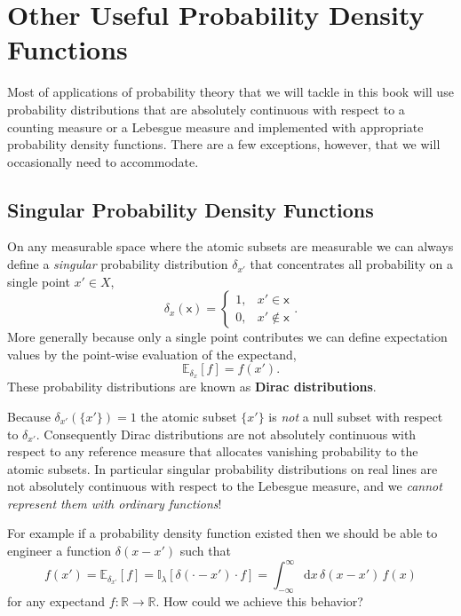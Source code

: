 \documentclass[
  letterpaper,
  DIV=11,
  numbers=noendperiod]{scrartcl}
\begin{document}
\hypertarget{other-useful-probability-density-functions}{%
\section{Other Useful Probability Density
Functions}\label{other-useful-probability-density-functions}}

Most of applications of probability theory that we will tackle in this
book will use probability distributions that are absolutely continuous
with respect to a counting measure or a Lebesgue measure and implemented
with appropriate probability density functions. There are a few
exceptions, however, that we will occasionally need to accommodate.

\hypertarget{singular-probability-density-functions}{%
\subsection{Singular Probability Density
Functions}\label{singular-probability-density-functions}}

On any measurable space where the atomic subsets are measurable we can
always define a \emph{singular} probability distribution \(\delta_{x'}\)
that concentrates all probability on a single point \(x' \in X\), \[
\delta_{x}(\mathsf{x}) =
\left\{
\begin{array}{rr}
1, & x' \in \mathsf{x} \\
0, & x' \notin \mathsf{x}
\end{array}
\right. .
\] More generally because only a single point contributes we can define
expectation values by the point-wise evaluation of the expectand, \[
\mathbb{E}_{\delta_{x}} [f] = f(x').
\] These probability distributions are known as \textbf{Dirac
distributions}.

Because \(\delta_{x'}(\{ x' \}) = 1\) the atomic subset \(\{ x' \}\) is
\emph{not} a null subset with respect to \(\delta_{x'}\). Consequently
Dirac distributions are not absolutely continuous with respect to any
reference measure that allocates vanishing probability to the atomic
subsets. In particular singular probability distributions on real lines
are not absolutely continuous with respect to the Lebesgue measure, and
we \emph{cannot represent them with ordinary functions}!

For example if a probability density function existed then we should be
able to engineer a function \(\delta(x - x')\) such that \[
f(x')
= \mathbb{E}_{\delta_{x'}} [f]
= \mathbb{I}_{\lambda} [ \delta(\cdot - x') \cdot f]
= \int_{-\infty}^{\infty} \mathrm{d} x \, \delta(x - x') \, f(x)
\] for any expectand \(f: \mathbb{R} \rightarrow \mathbb{R}\). How could
we achieve this behavior?
\end{document}
